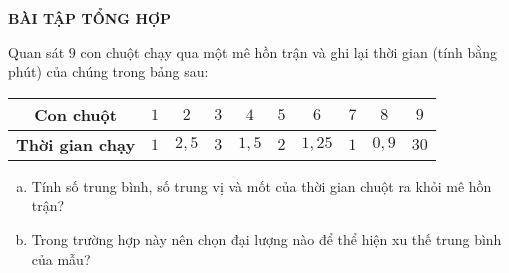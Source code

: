 \begin{center}
	\textbf{BÀI TẬP TỔNG HỢP}
\end{center}
\begin{bt}%
Quan sát $9$ con chuột chạy qua một mê hồn trận và ghi lại thời gian (tính bằng phút) của chúng trong bảng sau:
\begin{center}
\renewcommand{\arraystretch}{1.25}
\begin{tabular}{|c|c|c|c|c|c|c|c|c|c|}
\hline
\textbf{Con chuột}&$1$&$2$&$3$&$4$&$5$&$6$&$7$&$8$&$9$\\ 
\hline
\textbf{Thời gian chạy}&$1$&$2,5$&$3$&$1,5$&$2$&$1,25$&$1$&$0,9$&$30$\\ 
\hline
\end{tabular}
\end{center}
\begin{enumerate}[a)]
\item Tính số trung bình, số trung vị và mốt của thời gian chuột ra khỏi mê hồn trận?
\item Trong trường hợp này nên chọn đại lượng nào để thể hiện xu thế trung bình của mẫu?
\end{enumerate}
\end{bt}

